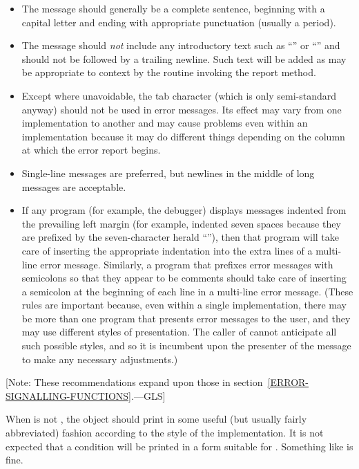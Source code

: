 \begin{itemize}
 \item
    The message should generally be a complete sentence, beginning with a
   capital letter and ending with appropriate punctuation (usually a period).

 \item
    The message should \emph{not} include any introductory text such as ``''
   or ``'' and should not be followed by a trailing newline. Such
   text will be added as may be appropriate to context by the routine invoking
   the report method.

 \item
    Except where unavoidable, the tab character (which is only semi-standard anyway)
    should not be used in
   error messages. Its effect may vary from one implementation to another and may
   cause problems even within an implementation because it may do different
   things depending on the column at which the error report begins.

 \item
    Single-line messages are preferred, but newlines in the middle of long
   messages are acceptable.

 \item
   If any program (for example, the debugger) displays messages indented from the
   prevailing left margin (for example, indented seven spaces because they
   are prefixed by the seven-character herald ``''), then that program
   will take care of inserting the appropriate indentation into the extra
   lines of a multi-line error message. Similarly, a program that prefixes
   error messages with semicolons so that they appear to be comments should
   take care of inserting a semicolon at the beginning of each line in a
   multi-line error message. (These rules are important because, even within
   a single implementation, there may be more than one program that presents
   error messages to the user, and they may use different styles of
   presentation. The caller of  cannot anticipate all such possible
   styles, and so it is incumbent upon the presenter of the message to make
   any necessary adjustments.)
\end{itemize}
[Note: These recommendations expand upon those in section~\ref{ERROR-SIGNALLING-FUNCTIONS}.---GLS]

When  is not , the object should print in some useful (but
usually fairly abbreviated) fashion according to the style of the
implementation. It is not expected that a condition will be printed in a form
suitable for . Something like 
is fine.


